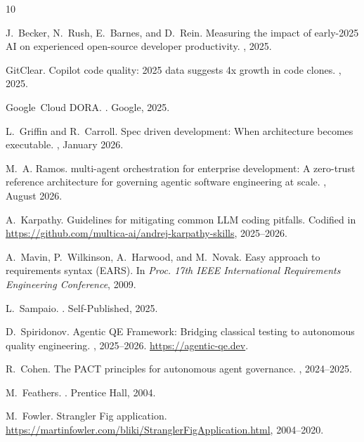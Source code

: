 \documentclass[11pt,a4paper]{article}
\begin{document}

\begin{thebibliography}{10}

J.~Becker, N.~Rush, E.~Barnes, and D.~Rein.
\newblock Measuring the impact of early-2025 {AI} on experienced open-source developer productivity.
, 2025.

GitClear.
 {C}opilot code quality: 2025 data suggests 4x growth in code clones.
, 2025.

Google~Cloud DORA.
.
\newblock Google, 2025.

L.~Griffin and R.~Carroll.
\newblock Spec driven development: When architecture becomes executable.
, January 2026.

M.~A. Ramos.
 multi-agent orchestration for enterprise development: A zero-trust reference architecture for governing agentic software engineering at scale.
, August 2026.

A.~Karpathy.
\newblock Guidelines for mitigating common {LLM} coding pitfalls.
\newblock Codified in \url{https://github.com/multica-ai/andrej-karpathy-skills}, 2025--2026.

A.~Mavin, P.~Wilkinson, A.~Harwood, and M.~Novak.
\newblock Easy approach to requirements syntax ({EARS}).
\newblock In {\em Proc. 17th IEEE International Requirements Engineering Conference}, 2009.

L.~Sampaio.
.
\newblock Self-Published, 2025.

D.~Spiridonov.
\newblock Agentic {QE} Framework: Bridging classical testing to autonomous quality engineering.
, 2025--2026. \url{https://agentic-qe.dev}.

R.~Cohen.
\newblock The {PACT} principles for autonomous agent governance.
, 2024--2025.

M.~Feathers.
.
\newblock Prentice Hall, 2004.

M.~Fowler.
\newblock Strangler {F}ig application.
\newblock \url{https://martinfowler.com/bliki/StranglerFigApplication.html}, 2004--2020.

\end{thebibliography}
\end{document}
